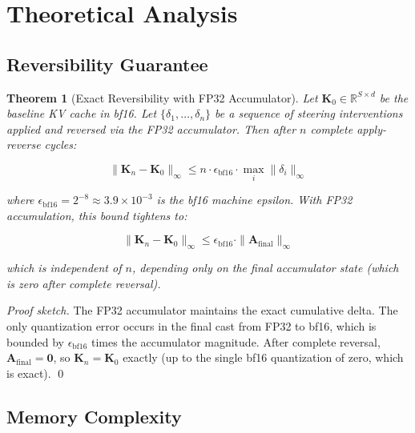 \documentclass[10pt]{article}
\newtheorem{theorem}{Theorem}
\begin{document}
\section{Theoretical Analysis}

\subsection{Reversibility Guarantee}

\begin{theorem}[Exact Reversibility with FP32 Accumulator]
Let $\mathbf{K}_0 \in \mathbb{R}^{S \times d}$ be the baseline KV cache in bf16. Let $\{\delta_1, \ldots, \delta_n\}$ be a sequence of steering interventions applied and reversed via the FP32 accumulator. Then after $n$ complete apply-reverse cycles:

\begin{equation}
\|\mathbf{K}_n - \mathbf{K}_0\|_\infty \leq n \cdot \epsilon_{\text{bf16}} \cdot \max_i \|\delta_i\|_\infty
\label{eq:reversibility_naive}
\end{equation}

where $\epsilon_{\text{bf16}} = 2^{-8} \approx 3.9 \times 10^{-3}$ is the bf16 machine epsilon. With FP32 accumulation, this bound tightens to:

\begin{equation}
\|\mathbf{K}_n - \mathbf{K}_0\|_\infty \leq \epsilon_{\text{bf16}} \cdot \|\mathbf{A}_{\text{final}}\|_\infty
\label{eq:reversibility_fp32}
\end{equation}

which is independent of $n$, depending only on the final accumulator state (which is zero after complete reversal).
\end{theorem}

\begin{proof}[Proof sketch]
The FP32 accumulator maintains the exact cumulative delta. The only quantization error occurs in the final cast from FP32 to bf16, which is bounded by $\epsilon_{\text{bf16}}$ times the accumulator magnitude. After complete reversal, $\mathbf{A}_{\text{final}} = \mathbf{0}$, so $\mathbf{K}_n = \mathbf{K}_0$ exactly (up to the single bf16 quantization of zero, which is exact). \qed
\end{proof}

\subsection{Memory Complexity}
\end{document}
